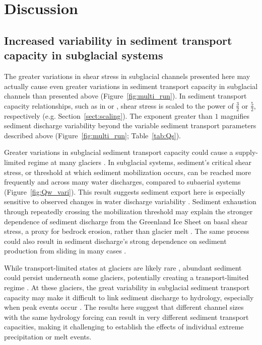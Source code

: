 \documentclass[tc, manuscript]{copernicus}
\begin{document}
\FloatBarrier
\section{Discussion}

\subsection{Increased variability in  sediment transport capacity in subglacial systems}
\label{sect:dis_qsc}

The greater variations in shear stress in subglacial channels presented here may actually cause even greater variations in sediment transport capacity in subglacial channels than presented above  (Figure~\ref{fig:multi_run}).
In sediment transport capacity relationships, such as in \citet{meyer1948} or \citet{engelund1967}, shear stress is scaled to the power of $\frac{3}{2}$ or $\frac{5}{2}$, respectively (e.g. Section~\ref{sect:scaling}).
The exponent greater than $1$ magnifies sediment discharge variability beyond the variable sediment transport parameters described above (Figure~\ref{fig:multi_run}; Table~\ref{tab:Qs}).

Greater variations in subglacial sediment transport capacity could cause a supply-limited regime at many glaciers \citep{alley1997}.
In subglacial systems, sediment's critical shear stress, or threshold at which sediment mobilization occurs, can be reached more frequently and across many water discharges, compared to subaerial systems (Figure~\ref{fig:Qw_vari}).
This result suggests sediment export here is especially sensitive to observed changes in water discharge variability \citep{lane2019b}.
Sediment exhaustion through repeatedly crossing the mobilization threshold may explain the stronger dependence of sediment discharge from the Greenland Ice Sheet on basal shear stress, a proxy for bedrock erosion, rather than glacier melt \citep{overeem2017}.
The same process could also result in sediment discharge's strong dependence on sediment production from sliding in many cases \citep{herman2015,koppes2015}.

While transport-limited states at glaciers are likely rare \citep[e.g.][]{alley1997}, abundant sediment could persist underneath some glaciers, potentially creating a transport-limited regime \citep[e.g.][]{walter2014,stevens2022,delaney2022}.
At these glaciers, the great variability in subglacial sediment transport capacity may make it difficult to link sediment discharge to hydrology, especially when peak events occur \citep{cowan1988,delaney2018,lu2022}.
The results here suggest that different channel sizes with the same hydrology forcing can result in very different sediment transport capacities, making it challenging to establish the effects of individual extreme precipitation or melt events.
\end{document}
